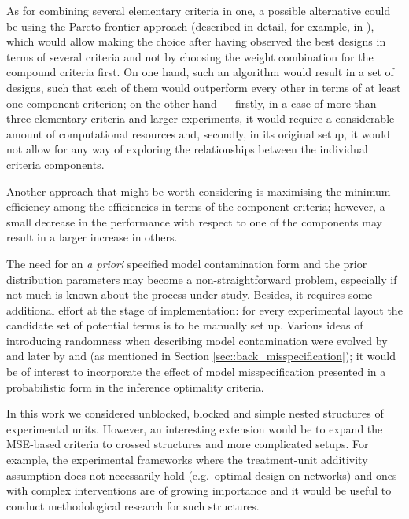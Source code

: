 As for combining several elementary criteria in one, a possible alternative could be using the Pareto frontier approach (described in detail, for example, in \cite{Lu2011optimization}), which would allow making the choice after having observed the best designs in terms of several criteria and not by choosing the weight combination for the compound criteria first. On one hand, such an algorithm would result in a set of designs, such that each of them would outperform every other in terms of at least one component criterion; on the other hand --- firstly, in a case of more than three elementary criteria and larger experiments, it would require a considerable amount of computational resources and, secondly, in its original setup, it would not allow for any way of exploring the relationships between the individual criteria components.

Another approach that might be worth considering is maximising the minimum efficiency among the efficiencies in terms of the component criteria; however, a small decrease in the performance with respect to one of the components may result in a larger increase in others.

The need for an \textit{a priori} specified model contamination form and the prior distribution parameters may become a non-straightforward problem, especially if not much is known about the process under study. Besides, it requires some additional effort at the stage of implementation: for every experimental layout the candidate set of potential terms is to be manually set up. Various ideas of introducing randomness when describing model contamination were evolved by \cite{Notz1989Optimal} and later by \cite{Allen2003Experimental} and \cite{Woods2005designing} (as mentioned in Section \ref{sec::back_misspecification}); it would be of interest to incorporate the effect of model misspecification presented in a probabilistic form in the inference optimality criteria. 

In this work we considered unblocked, blocked and simple nested structures of experimental units. However, an interesting extension would be to expand the MSE-based criteria to crossed structures and more complicated setups. For example, the experimental frameworks where the treatment-unit additivity assumption does not necessarily hold (e.g.~optimal design on networks) and ones with complex interventions are of growing importance and it would be useful to conduct methodological research for such structures. 

